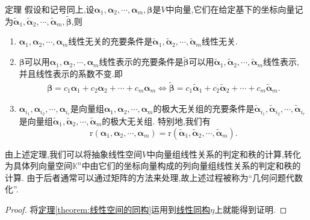 \documentclass[../../main.tex]{subfiles}%
\begin{document}
\begin{theorem}\label{theorem:线性空间的同构11}
定理 假设和记号同上,设\(\boldsymbol{\alpha}_1,\boldsymbol{\alpha}_2,\cdots,\boldsymbol{\alpha}_m,\boldsymbol{\beta}\)是\(V\)中向量,它们在给定基下的坐标向量记为\(\widetilde{\boldsymbol{\alpha}}_1,\widetilde{\boldsymbol{\alpha}}_2,\cdots,\widetilde{\boldsymbol{\alpha}}_m,\widetilde{\boldsymbol{\beta}}\),则
\begin{enumerate}[(1)]
\item \(\boldsymbol{\alpha}_1,\boldsymbol{\alpha}_2,\cdots,\boldsymbol{\alpha}_m\)线性无关的充要条件是\(\widetilde{\boldsymbol{\alpha}}_1,\widetilde{\boldsymbol{\alpha}}_2,\cdots,\widetilde{\boldsymbol{\alpha}}_m\)线性无关.

\item \(\boldsymbol{\beta}\)可以用\(\boldsymbol{\alpha}_1,\boldsymbol{\alpha}_2,\cdots,\boldsymbol{\alpha}_m\)线性表示的充要条件是\(\widetilde{\boldsymbol{\beta}}\)可以用\(\widetilde{\boldsymbol{\alpha}}_1,\widetilde{\boldsymbol{\alpha}}_2,\cdots,\widetilde{\boldsymbol{\alpha}}_m\)线性表示,
并且线性表示的系数不变.即\begin{align*}
\boldsymbol{\beta }=c_1\boldsymbol{\alpha }_1+c_2\boldsymbol{\alpha }_2+\cdots +c_m\boldsymbol{\alpha }_m\Leftrightarrow \widetilde{\boldsymbol{\beta }}=c_1\widetilde{\boldsymbol{\alpha }}_1+c_2\widetilde{\boldsymbol{\alpha }}_2+\cdots +c_m\widetilde{\boldsymbol{\alpha }}_m.
\end{align*}

\item \(\boldsymbol{\alpha}_{i_1},\boldsymbol{\alpha}_{i_2},\cdots,\boldsymbol{\alpha}_{i_r}\)是向量组\(\boldsymbol{\alpha}_1,\boldsymbol{\alpha}_2,\cdots,\boldsymbol{\alpha}_m\)的极大无关组的充要条件是\(\widetilde{\boldsymbol{\alpha}}_{i_1},\widetilde{\boldsymbol{\alpha}}_{i_2},\cdots,\widetilde{\boldsymbol{\alpha}}_{i_r}\)是向量组\(\widetilde{\boldsymbol{\alpha}}_1,\widetilde{\boldsymbol{\alpha}}_2,\cdots,\widetilde{\boldsymbol{\alpha}}_m\)的极大无关组. 特别地,我们有
\[
\mathrm{r}(\boldsymbol{\alpha}_1,\boldsymbol{\alpha}_2,\cdots,\boldsymbol{\alpha}_m)=\mathrm{r}(\widetilde{\boldsymbol{\alpha}}_1,\widetilde{\boldsymbol{\alpha}}_2,\cdots,\widetilde{\boldsymbol{\alpha}}_m).
\]
\end{enumerate}
\end{theorem}
\begin{note}
由上述定理,我们可以将抽象线性空间\(V\)中向量组线性关系的判定和秩的计算,转化为具体列向量空间\(\mathbb{K}^n\)中由它们的坐标向量构成的列向量组线性关系的判定和秩的计算. 由于后者通常可以通过矩阵的方法来处理,故上述过程被称为“几何问题代数化”.
\end{note}
\begin{proof}

将\hyperref[theorem:线性空间的同构]{定理\ref{theorem:线性空间的同构}}运用到\hyperlink{线性同构1}{线性同构$\eta$}上就能得到证明.

\end{proof}
\end{document}
